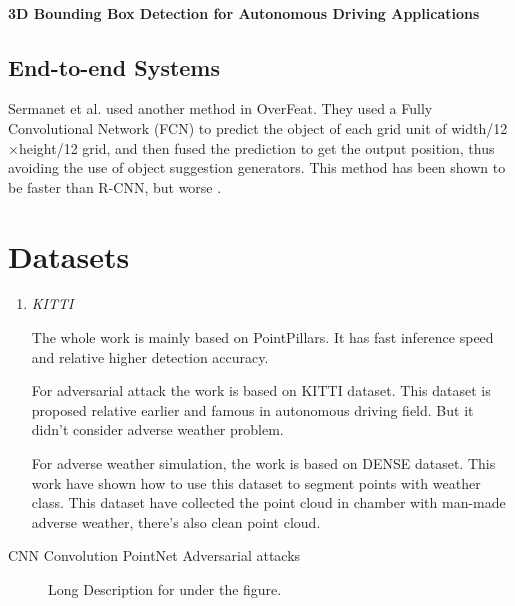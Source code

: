 \paragraph{3D Bounding Box Detection for Autonomous Driving Applications}

\subsection{End-to-end Systems}

Sermanet et al. used another method in OverFeat\cite{sermanet_overfeat_2014}. They used a Fully Convolutional Network (FCN) to predict the object of each grid unit of width/12\(\times\)height/12 grid, and then fused the prediction to get the output position, thus avoiding the use of object suggestion generators. This method has been shown to be faster than R-CNN, but worse \cite{girshick_rich_2014}. 
\section{Datasets}
\begin{enumerate}
\item\textit{KITTI}


The whole work is mainly based on PointPillars\cite{lang_pointpillars_2019}. It has fast inference speed and relative higher detection accuracy.

For adversarial attack the work is based on KITTI\cite{geiger_vision_2013} dataset. This dataset is proposed relative earlier and famous in autonomous driving field. But it didn't consider adverse weather problem.

For adverse weather simulation, the work is based on DENSE\cite{heinzler_cnn-based_2020} dataset. This work have shown how to use this dataset to segment points with weather class. This dataset have collected the point cloud in chamber with man-made adverse weather, there's also clean point cloud. 

\end{enumerate}
CNN
Convolution
PointNet
Adversarial attacks
\begin{figure}[!htbp]
    \centering
    \hspace{10pt}
    \caption[Short Description for List of Figures]{Long Description for under the figure.}
    \label{fig:logo1and2}
\end{figure}

